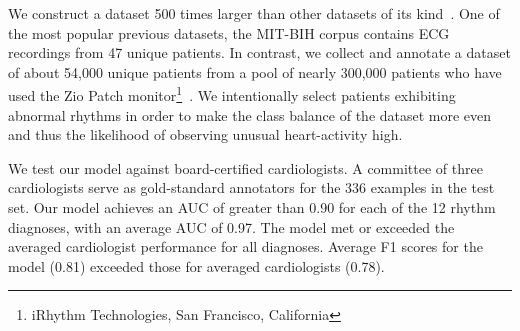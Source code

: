 We construct a dataset 500 times larger than other datasets of its
kind~\cite{moody2001impact, goldberger2000physiobank}. One of the most popular
previous datasets, the MIT-BIH corpus contains ECG recordings from 47 unique
patients. In contrast, we collect and annotate a dataset of about 54,000 unique
patients from a pool of nearly 300,000 patients who have used the Zio Patch
monitor\footnote[1]{iRhythm Technologies, San Francisco,
California}~\cite{turakhia2013diagnostic}. We intentionally select patients
exhibiting abnormal rhythms in order to make the class balance of the dataset
more even and thus the likelihood of observing unusual heart-activity high.

We test our model against board-certified cardiologists. A committee of three
cardiologists serve as gold-standard annotators for the 336 examples in the
test set. Our model achieves an AUC of greater than 0.90 for each of the 12
rhythm diagnoses, with an average AUC of 0.97. The model met or exceeded the
averaged cardiologist performance for all diagnoses. Average F1 scores for the
model (0.81) exceeded those for averaged cardiologists (0.78).
